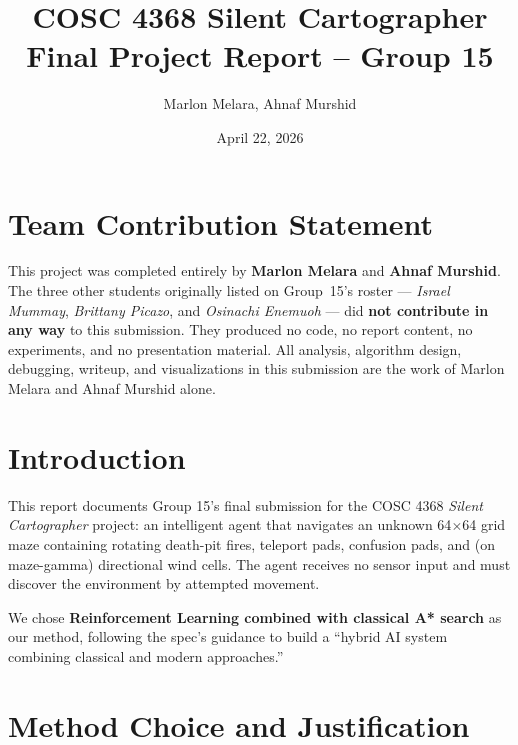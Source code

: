 \documentclass[11pt]{article}
\title{COSC 4368 Silent Cartographer \\ Final Project Report -- Group 15}
\author{Marlon Melara, Ahnaf Murshid}
\date{April 22, 2026}
\begin{document}
\maketitle

\section*{Team Contribution Statement}

This project was completed entirely by \textbf{Marlon Melara} and
\textbf{Ahnaf Murshid}.  The three other students originally listed
on Group~15's roster --- \emph{Israel Mummay}, \emph{Brittany Picazo},
and \emph{Osinachi Enemuoh} --- did \textbf{not contribute in any
way} to this submission.  They produced no code, no report content,
no experiments, and no presentation material.  All analysis,
algorithm design, debugging, writeup, and visualizations in this
submission are the work of Marlon Melara and Ahnaf Murshid alone.

\section{Introduction}

This report documents Group 15's final submission for the COSC 4368
\emph{Silent Cartographer} project: an intelligent agent that navigates
an unknown 64$\times$64 grid maze containing rotating death-pit fires,
teleport pads, confusion pads, and (on maze-gamma) directional wind cells.
The agent receives no sensor input and must discover the environment by
attempted movement.

We chose \textbf{Reinforcement Learning combined with classical A* search}
as our method, following the spec's guidance to build a ``hybrid AI
system combining classical and modern approaches.''

\section{Method Choice and Justification}
\end{document}
